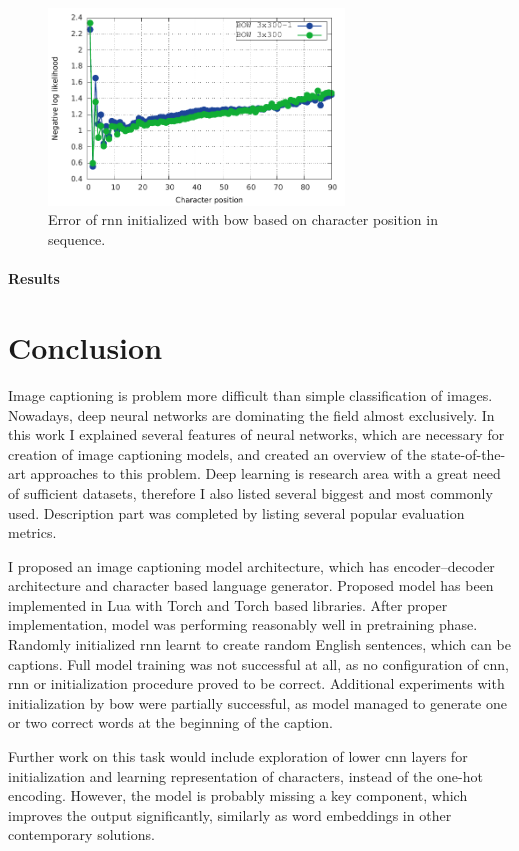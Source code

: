 \begin{figure}[!t]
	\centering
	\includegraphics[width=0.7\textwidth]{fig/error_bow.pdf}
	\caption{Error of \gls{rnn} initialized with \gls{bow} based on character position in sequence.
		\label{fig:error_bow}}
\end{figure}

\subsubsection{Results}

\chapter{Conclusion}\label{chp:conclusion}

Image captioning is problem more difficult than simple classification of images. Nowadays, deep neural networks are dominating the field almost exclusively. In this work I explained several features of neural networks, which are necessary for creation of image captioning models, and created an overview of the state-of-the-art approaches to this problem. Deep learning is research area with a great need of sufficient datasets, therefore I also listed several biggest and most commonly used. Description part was completed by listing several popular evaluation metrics.

I proposed an image captioning model architecture, which has encoder--decoder architecture and character based language generator. Proposed model has been implemented in Lua with Torch and Torch based libraries. After proper implementation, model was performing reasonably well in pretraining phase. Randomly initialized \gls{rnn} learnt to create random English sentences, which can be captions. Full model training was not successful at all, as no configuration of \gls{cnn}, \gls{rnn} or initialization procedure proved to be correct. Additional experiments with initialization by \gls{bow} were partially successful, as model managed to generate one or two correct words at the beginning of the caption.

Further work on this task would include exploration of lower \gls{cnn} layers for initialization and learning representation of characters, instead of the one-hot encoding. However, the model is probably missing a key component, which improves the output significantly, similarly as word embeddings in other contemporary solutions.

